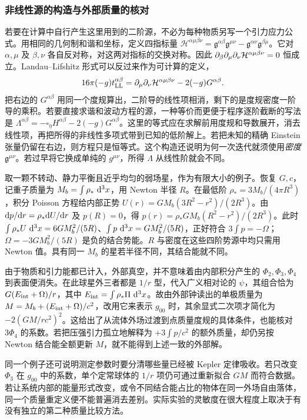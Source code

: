 \subsubsection{非线性源的构造与外部质量的核对}\label{sec:pn-binding}

若要在计算中自行产生这里用到的二阶源，不必为每种物质另写一个引力应力公式。用相同的几何制和谐和坐标，定义四指标量
$\mathcal H^{\alpha\mu\beta\nu}=\mathfrak g^{\alpha\beta}\mathfrak g^{\mu\nu}
-\mathfrak g^{\alpha\nu}\mathfrak g^{\beta\mu}$。它对 $\alpha,\mu$ 及 $\beta,\nu$ 各自反对称，对这两对指标的交换对称。因此 $\partial_\beta\partial_\mu\partial_\nu\mathcal H^{\alpha\mu\beta\nu}=0$ 恒成立。Landau--Lifshitz 形式可以反过来作为可计算的定义，
\[
 16\pi(-g)t_{\rm LL}^{\alpha\beta}
 =\partial_\mu\partial_\nu\mathcal H^{\alpha\mu\beta\nu}
                       -2(-g)G^{\alpha\beta}.
\]
把右边的 $G^{\alpha\beta}$ 用同一个度规算出，二阶导的线性项相消，剩下的是度规密度一阶导的乘积。若要直接求谐和波动方程的源，一种等价而更便于程序逐阶截断的写法是 $\Lambda^{\alpha\beta}=-\square_\eta H^{\alpha\beta}-2(-g)G^{\alpha\beta}$。这里的等式应在求解前用度规和导数展开，消去线性项，再把所得的非线性多项式带到已知的低阶解上。若把未知的精确 Einstein 张量仍留在右边，则方程只是恒等式。这个构造还说明为何一次迭代就须使用\emph{密度} $\mathfrak g^{\mu\nu}$。若过早将它换成单纯的 $g^{\mu\nu}$，所得 $\Lambda$ 从线性阶就会不同。

取一颗不转动、静力平衡且近乎均匀的弱场星，作为有限大小的例子。恢复 $G,c$，记重子质量为 $M_b=\int\rho_*\,\dd[3]{x}$，用 Newton 半径 $R$。在最低阶 $\rho_*=3M_b/(4\pi R^3)$，积分 Poisson 方程给内部正势 $U(r)=GM_b(3R^2-r^2)/(2R^3)$。由 $\dd p/\dd r=\rho_*\dd U/\dd r$ 及 $p(R)=0$，得 $p(r)=\rho_*GM_b(R^2-r^2)/(2R^3)$。此时 $\int\rho_*U\,\dd[3]{x}=6GM_b^2/(5R)$、$\int p\,\dd[3]{x}=GM_b^2/(5R)$，正好符合 $3\int p=-\Omega$；$\Omega=-3GM_b^2/(5R)$ 是负的结合势能。$R$ 与密度在这些四阶势源中均只需用 Newton 值。具有同一 $M_b$ 的星若半径不同，其结合能就不同。

由于物质和引力能都已计入，外部真空，并不意味着由内部积分产生的 $\Phi_2,\Phi_3,\Phi_4$ 到表面便消失。在此球星外三者都是 $1/r$ 型，代入广义相对论的 $\psi$，其组合恰为 $G(E_{\rm int}+\Omega)/r$，其中 $E_{\rm int}=\int\rho_*\Pi\,\dd[3]{x}$。故由外部钟读出的单极质量为 $M=M_b+(E_{\rm int}+\Omega)/c^2$，改用它来表示 $g_{00}$ 时，其余显式二次项才简化为 $-2(GM/rc^2)^2$。这给出了从流体外场过渡到点质量度规的具体条件，也能核对 $3\Phi_4$ 的系数。若把压强引力孤立地解释为 $+3\int p/c^2$ 的额外质量，却仍另按 Newton 结合能全额更新 $M$，就不能得到上述一致的外部解。

同一个例子还可说明测定参数时要分清哪些量已经被 Kepler 定律吸收。若只改变 $\Phi_3$ 在 $g_{00}$ 中的系数，单个定常球体的 $1/r$ 项仍可通过重新拟合 $GM$ 而符合数据。若让系统内部的能量形式改变，或令不同结合能占比的物体在同一外场自由落体，同一个质量重定义便不能普遍消去差别。实际实验的灵敏度在很大程度上取决于有没有独立的第二种质量比较方法。

